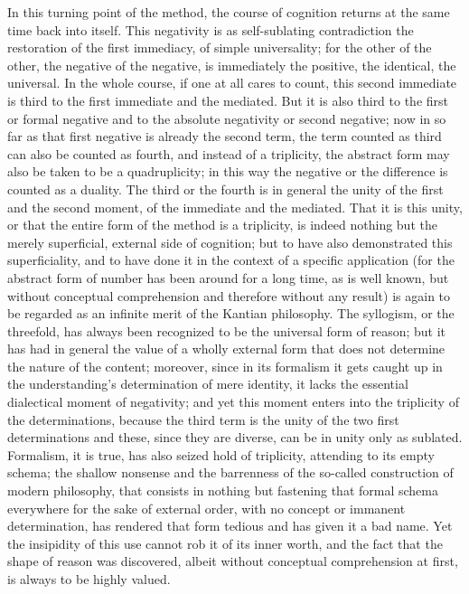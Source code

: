In this turning point of the method,
the course of cognition returns at the
same time back into itself.
This negativity is as self-sublating contradiction
the restoration of the first immediacy, of simple universality;
for the other of the other, the negative of the negative,
is immediately the positive, the identical, the universal.
In the whole course, if one at all cares to count,
this second immediate is third to the first immediate and the mediated.
But it is also third to the first or formal negative
and to the absolute negativity or second negative;
now in so far as that first negative is already the second
term, the term counted as third can also be counted as fourth,
and instead of a triplicity, the abstract form
may also be taken to be a quadruplicity;
in this way the negative or the difference
is counted as a duality.
The third or the fourth is in general
the unity of the first and the second moment,
of the immediate and the mediated.
That it is this unity,
or that the entire form of the method is a triplicity,
is indeed nothing but the merely superficial,
external side of cognition;
but to have also demonstrated this superficiality,
and to have done it in the context of a specific application
(for the abstract form of number has been around for a long time,
as is well known, but without conceptual comprehension
and therefore without any result)
is again to be regarded as an infinite merit of the Kantian philosophy.
The syllogism, or the threefold, has always been recognized
to be the universal form of reason;
but it has had in general the value of a wholly external form
that does not determine the nature of the content;
moreover, since in its formalism it gets caught up
in the understanding's determination of mere identity,
it lacks the essential dialectical moment of negativity;
and yet this moment enters into the triplicity of the determinations,
because the third term is the unity of the two first determinations
and these, since they are diverse, can be in unity only as sublated.
Formalism, it is true, has also seized hold of triplicity,
attending to its empty schema;
the shallow nonsense and the barrenness of
the so-called construction of modern philosophy,
that consists in nothing but fastening that formal schema
everywhere for the sake of external order,
with no concept or immanent determination,
has rendered that form tedious and has given it a bad name.
Yet the insipidity of this use cannot rob it of its inner worth,
and the fact that the shape of reason was discovered,
albeit without conceptual comprehension at first,
is always to be highly valued.

